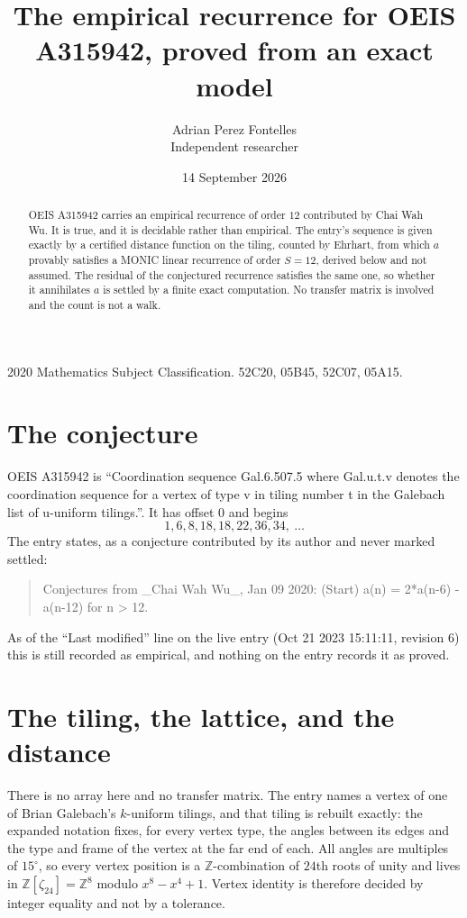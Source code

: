 \documentclass[11pt,a4paper]{article}
\title{The empirical recurrence for OEIS A315942, proved from an exact model}
\author{Adrian Perez Fontelles\\ \small Independent researcher}
\date{14 September 2026}
\theoremstyle{plain}
\theoremstyle{definition}
\begin{document}
\maketitle

\begin{abstract}
OEIS A315942 carries an empirical recurrence of order $12$ contributed by Chai Wah Wu. It is true, and it is
decidable rather than empirical. The entry's sequence is given exactly by a certified distance function on the tiling, counted by Ehrhart, from
which $a$ provably satisfies a MONIC linear recurrence of order $S=12$, derived below and not
assumed. The residual of the conjectured recurrence satisfies the same one, so whether it
annihilates $a$ is settled by a finite exact computation. No transfer matrix is involved and the count is not a walk.
\end{abstract}

\noindent\small 2020 Mathematics Subject Classification. 52C20, 05B45, 52C07, 05A15.\normalsize

\section{The conjecture}

OEIS A315942 is ``Coordination sequence Gal.6.507.5 where Gal.u.t.v denotes the coordination sequence for a vertex of type v in tiling number t in the Galebach list of u-uniform tilings.''. It has offset $0$ and begins
\[
1, 6, 8, 18, 18, 22, 36, 34,\ \dots
\]
The entry states, as a conjecture contributed by its author and never marked settled:
\begin{quote}
Conjectures from \_Chai Wah Wu\_, Jan 09 2020: (Start) a(n) = 2*a(n-6) - a(n-12) for n > 12.
\end{quote}
As of the ``Last modified'' line on the live entry (Oct 21 2023 15:11:11, revision 6)
this is still recorded as empirical, and nothing on the entry records it as proved.

\section{The tiling, the lattice, and the distance}

There is no array here and no transfer matrix. The entry names a vertex of one of Brian
Galebach's $k$-uniform tilings, and that tiling is rebuilt exactly: the expanded notation
fixes, for every vertex type, the angles between its edges and the type and frame of the
vertex at the far end of each. All angles are multiples of $15^\circ$, so every vertex
position is a $\mathbb{Z}$-combination of $24$th roots of unity and lives in
$\mathbb{Z}[\zeta_{24}]=\mathbb{Z}^{8}$ modulo $x^{8}-x^{4}+1$. Vertex identity is
therefore decided by integer equality and not by a tolerance.
\end{document}

